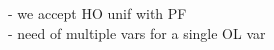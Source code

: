 \documentclass[sigconf,natbib=false]{acmart}
\begin{document}
- we accept HO unif with PF \\
- need of multiple vars for a single OL var
















  

\end{document}
